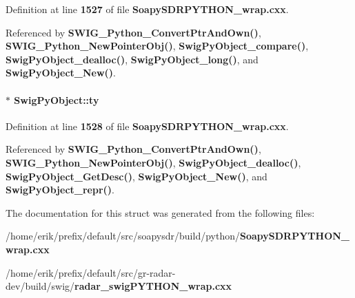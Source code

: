Definition at line {\bf 1527} of file {\bf Soapy\+S\+D\+R\+P\+Y\+T\+H\+O\+N\+\_\+wrap.\+cxx}.



Referenced by {\bf S\+W\+I\+G\+\_\+\+Python\+\_\+\+Convert\+Ptr\+And\+Own()}, {\bf S\+W\+I\+G\+\_\+\+Python\+\_\+\+New\+Pointer\+Obj()}, {\bf Swig\+Py\+Object\+\_\+compare()}, {\bf Swig\+Py\+Object\+\_\+dealloc()}, {\bf Swig\+Py\+Object\+\_\+long()}, and {\bf Swig\+Py\+Object\+\_\+\+New()}.

\paragraph[{ty}]{ $\ast$ Swig\+Py\+Object\+::ty}\label{structSwigPyObject_a77f6f8357ce9c50f7c18c2a4ea72ea62}


Definition at line {\bf 1528} of file {\bf Soapy\+S\+D\+R\+P\+Y\+T\+H\+O\+N\+\_\+wrap.\+cxx}.



Referenced by {\bf S\+W\+I\+G\+\_\+\+Python\+\_\+\+Convert\+Ptr\+And\+Own()}, {\bf S\+W\+I\+G\+\_\+\+Python\+\_\+\+New\+Pointer\+Obj()}, {\bf Swig\+Py\+Object\+\_\+dealloc()}, {\bf Swig\+Py\+Object\+\_\+\+Get\+Desc()}, {\bf Swig\+Py\+Object\+\_\+\+New()}, and {\bf Swig\+Py\+Object\+\_\+repr()}.



The documentation for this struct was generated from the following files\+:\begin{DoxyCompactItemize}
\item 
/home/erik/prefix/default/src/soapysdr/build/python/{\bf Soapy\+S\+D\+R\+P\+Y\+T\+H\+O\+N\+\_\+wrap.\+cxx}\item 
/home/erik/prefix/default/src/gr-\/radar-\/dev/build/swig/{\bf radar\+\_\+swig\+P\+Y\+T\+H\+O\+N\+\_\+wrap.\+cxx}\end{DoxyCompactItemize}
